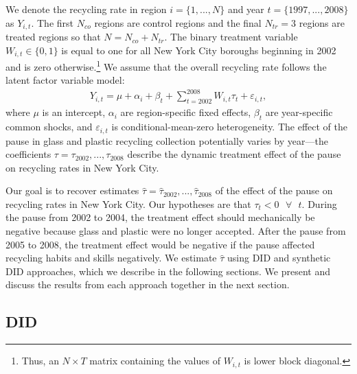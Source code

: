\documentclass[12pt]{article}
\begin{document}
We denote the recycling rate in region \(i = \lbrace 1,...,N \rbrace\) and year \(t = \lbrace 1997,...,2008 \rbrace\) as \(Y_{i,t}\).  The first \(N_{co}\) regions are control regions and the final \(N_{tr} = 3\) regions are treated regions so that \(N=N_{co}+N_{tr}\).  The binary treatment variable \(W_{i,t} \in \lbrace 0,1 \rbrace\) is equal to one for all New York City boroughs beginning in 2002 and is zero otherwise.\footnote{Thus, an \(N \times T\) matrix containing the values of \(W_{i,t}\) is lower block diagonal.}  We assume that the overall recycling rate follows the latent factor variable model:
\begin{align} \label{eq:factormodel}
    Y_{i,t} = \mu + \alpha_i + \beta_t + \sum_{t=2002}^{2008} W_{i,t} \tau_t + \varepsilon_{i,t},
\end{align}
where \(\mu\) is an intercept, \(\alpha_i\) are region-specific fixed effects, \(\beta_t\) are year-specific common shocks, and \(\varepsilon_{i,t}\) is conditional-mean-zero heterogeneity.  The effect of the pause in glass and plastic recycling collection potentially varies by year---the coefficients \(\tau = \tau_{2002},...,\tau_{2008}\) describe the dynamic treatment effect of the pause on recycling rates in New York City.  

Our goal is to recover estimates \(\hat{\tau} = \hat{\tau}_{2002},...,\hat{\tau}_{2008}\) of the effect of the pause on recycling rates in New York City.  Our hypotheses are that \(\tau_t < 0 \text{ } \forall \text{ } t\).  During the pause from 2002 to 2004, the treatment effect should mechanically be negative because glass and plastic were no longer accepted.  After the pause from 2005 to 2008, the treatment effect would be negative if the pause affected recycling habits and skills negatively.  We estimate \(\hat{\tau}\) using DID and synthetic DID approaches, which we describe in the following sections.  We present and discuss the results from each approach together in the next section.

\subsection{DID}
\end{document}

